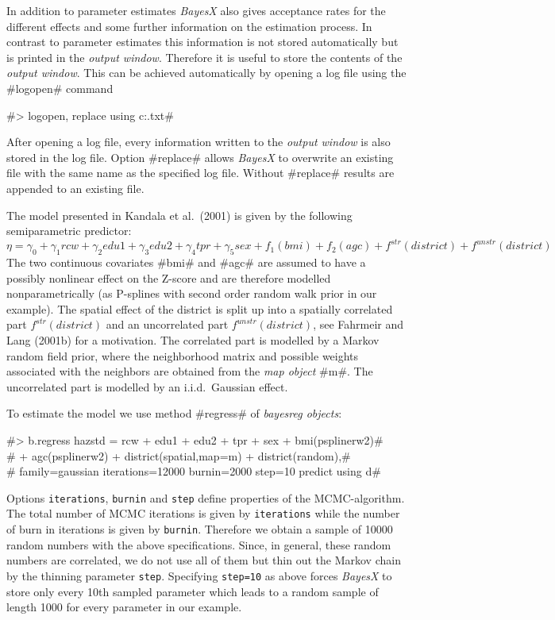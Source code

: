 In addition to parameter estimates {\it BayesX} also gives
acceptance rates for the different effects and some further
information on the estimation process. In contrast to parameter
estimates this information is not stored automatically but is
printed in the {\it output window}. Therefore it is useful to
store the contents of the {\it output window}. This can be
achieved automatically by opening a log file using the #logopen#
command

#> logopen, replace using c:\data\logmcmc.txt#

After opening a log file, every information written to the {\em
output window} is also stored in the log file. Option #replace#
allows {\it BayesX} to overwrite an existing file with the same
name as the specified log file. Without #replace# results are
appended to an existing file.

The model presented in Kandala et al.~(2001) is given by the
following semiparametric predictor:
\[\eta=\gamma_0+\gamma_1rcw+\gamma_2edu1+\gamma_3edu2+\gamma_4tpr+\gamma_5sex+f_1(bmi)+f_2(agc)+f^{str}(district)+f^{unstr}(district)\]
The two continuous covariates #bmi# and #agc# are assumed to have
a possibly nonlinear effect on the Z-score and are therefore
modelled nonparametrically (as P-splines with second order random
walk prior in our example). The spatial effect of the district is
split up into a spatially correlated part $ f^{str}(district)$ and
an uncorrelated part $f^{unstr}(district)$, see Fahrmeir and Lang
(2001b) for a motivation. The correlated part is modelled by a
Markov random field prior, where the neighborhood matrix and
possible weights associated with the neighbors are obtained from
the {\it map object} #m#. The uncorrelated part is modelled by an
i.i.d.~Gaussian effect.

To estimate the model we use method #regress# of {\em bayesreg
objects}:

 #> b.regress hazstd = rcw + edu1 + edu2 + tpr + sex + bmi(psplinerw2)#\\
 #  + agc(psplinerw2) + district(spatial,map=m) + district(random),#\\
 #  family=gaussian iterations=12000 burnin=2000 step=10 predict using d#

Options {\tt iterations}, {\tt burnin} and {\tt step} define
properties of the MCMC-algorithm. The total number of MCMC
iterations is given by {\tt iterations} while the number of burn
in iterations is given by {\tt burnin}. Therefore we obtain a
sample of 10000 random numbers with the above specifications.
Since, in general, these random numbers are correlated, we do not
use all of them but thin out the Markov chain by the thinning
parameter {\tt step}. Specifying {\tt step=10} as above forces
{\em BayesX} to store only every 10th sampled parameter which
leads to a random sample of length 1000 for every parameter in our
example.

